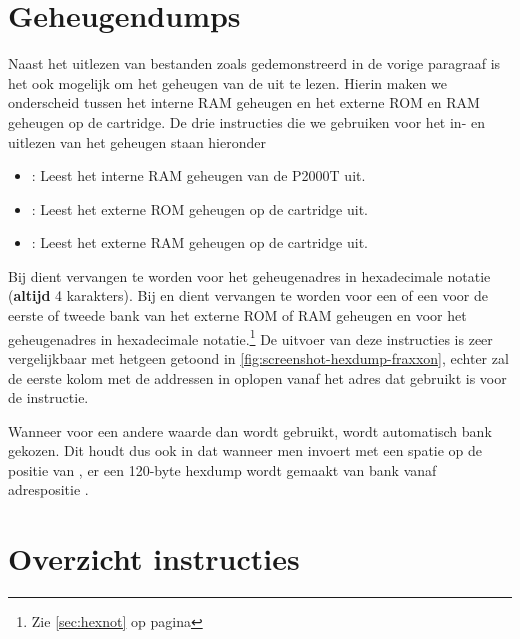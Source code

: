 %
%
%
\section{Geheugendumps}
\label{sec:memdumps}

Naast het uitlezen van bestanden zoals gedemonstreerd in de vorige paragraaf is het ook mogelijk om het geheugen van de  uit te lezen. Hierin maken we onderscheid tussen het interne RAM geheugen en het externe ROM en RAM geheugen op de cartridge. De drie instructies die we gebruiken voor het in- en uitlezen van het geheugen staan hieronder

\begin{itemize}[noitemsep]
    \item {}: Leest het interne RAM geheugen van de P2000T uit.  
    \item {}: Leest het externe ROM geheugen op de cartridge uit.  
    \item {}: Leest het externe RAM geheugen op de cartridge uit.  
\end{itemize}

Bij  dient  vervangen te worden voor het geheugenadres in hexadecimale notatie (\textbf{altijd} 4 karakters). Bij  en  dient  vervangen te worden voor een  of een  voor de eerste of tweede bank van het externe ROM of RAM geheugen en  voor het geheugenadres in hexadecimale notatie.\footnote{Zie \cref{sec:hexnot} op pagina \pageref{sec:hexnot}} De uitvoer van deze instructies is zeer vergelijkbaar met hetgeen getoond in \cref{fig:screenshot-hexdump-fraxxon}, echter zal de eerste kolom met de addressen in  oplopen vanaf het adres dat gebruikt is voor de instructie.

Wanneer voor  een andere waarde dan  wordt gebruikt, wordt automatisch bank  gekozen. Dit houdt dus ook in dat wanneer men  invoert met een spatie op de positie van , er een 120-byte hexdump wordt gemaakt van bank  vanaf adrespositie .

%
%
%
\section{Overzicht instructies}

